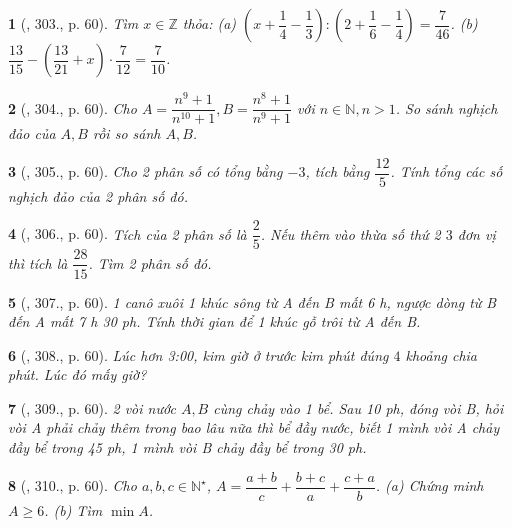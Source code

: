 \documentclass{article}
\newtheorem{baitoan}{}
\begin{document}
\begin{baitoan}[\cite{Tuyen_Toan_6}, 303., p. 60]
	Tìm $x\in\mathbb{Z}$ thỏa: (a) $\left(x + \dfrac{1}{4} - \dfrac{1}{3}\right):\left(2 + \dfrac{1}{6} - \dfrac{1}{4}\right) = \dfrac{7}{46}$. (b) $\dfrac{13}{15} - \left(\dfrac{13}{21} + x\right)\cdot\dfrac{7}{12} = \dfrac{7}{10}$.
\end{baitoan}

\begin{baitoan}[\cite{Tuyen_Toan_6}, 304., p. 60]
	Cho $A = \dfrac{n^9 + 1}{n^{10} + 1},B = \dfrac{n^8 + 1}{n^9 + 1}$ với $n\in\mathbb{N},n > 1$. So sánh nghịch đảo của $A,B$ rồi so sánh $A,B$.
\end{baitoan}

\begin{baitoan}[\cite{Tuyen_Toan_6}, 305., p. 60]
	Cho 2 phân số có tổng bằng $-3$, tích bằng $\dfrac{12}{5}$. Tính tổng các số nghịch đảo của 2 phân số đó.
\end{baitoan}

\begin{baitoan}[\cite{Tuyen_Toan_6}, 306., p. 60]
	Tích của 2 phân số là $\dfrac{2}{5}$. Nếu thêm vào thừa số thứ 2 $3$ đơn vị thì tích là $\dfrac{28}{15}$. Tìm 2 phân số đó.
\end{baitoan}

\begin{baitoan}[\cite{Tuyen_Toan_6}, 307., p. 60]
	1 canô xuôi 1 khúc sông từ A đến B mất {\rm6 h}, ngược dòng từ B đến A mất {\rm7 h 30 ph}. Tính thời gian để 1 khúc gỗ trôi từ A đến B.
\end{baitoan}

\begin{baitoan}[\cite{Tuyen_Toan_6}, 308., p. 60]
	Lúc hơn {\rm3:00}, kim giờ ở trước kim phút đúng $4$ khoảng chia phút. Lúc đó mấy giờ?
\end{baitoan}

\begin{baitoan}[\cite{Tuyen_Toan_6}, 309., p. 60]
	2 vòi nước $A,B$ cùng chảy vào 1 bể. Sau {\rm10 ph}, đóng vòi B, hỏi vòi A phải chảy thêm trong bao lâu nữa thì bể đầy nước, biết 1 mình vòi A chảy đầy bể trong {\rm45 ph}, 1 mình vòi B chảy đầy bể trong {\rm30 ph}.
\end{baitoan}

\begin{baitoan}[\cite{Tuyen_Toan_6}, 310., p. 60]
	Cho $a,b,c\in\mathbb{N}^\star$, $A = \dfrac{a + b}{c} + \dfrac{b + c}{a} + \dfrac{c + a}{b}$. (a) Chứng minh $A\ge6$. (b) Tìm $\min A$.
\end{baitoan}
\end{document}
